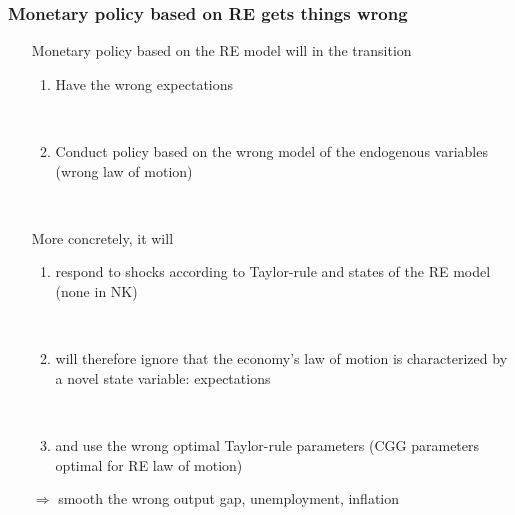 \documentclass{beamer}
\begin{document}
\begin{frame}
	\frametitle{Monetary policy based on RE gets things wrong}

\begin{enumerate}
\item[] Monetary policy based on the RE model will in the transition
\begin{enumerate}
\item Have the wrong expectations 


\


\item Conduct policy based on the wrong model of the endogenous variables (wrong law of motion)

\end{enumerate}

\

\item[] More concretely, it will
\begin{enumerate}
\item respond to shocks according to Taylor-rule and states of the RE model (none in NK)


\


\item will therefore ignore that the economy's law of motion is characterized by a novel state variable: expectations

\

\item and use the wrong optimal Taylor-rule parameters (CGG parameters optimal for RE law of motion)

\end{enumerate}

\item[$\Rightarrow$] smooth the wrong output gap, unemployment, inflation
\end{enumerate}

\end{frame}
\end{document}
